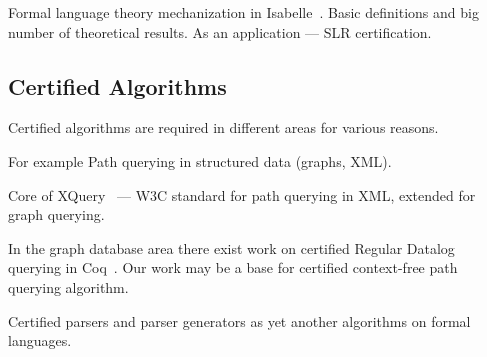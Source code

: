Formal language theory mechanization in Isabelle~\cite{1885-16399}.
Basic definitions and big number of theoretical results. 
As an application --- SLR certification.

\subsection{Certified Algorithms}

Certified algorithms are required in different areas for various reasons.

For example Path querying in structured data (graphs, XML).

Core of XQuery~\cite{10.1007/978-3-642-25379-9_21} --- W3C standard for path querying in XML, extended for graph querying.

In the graph database area there exist work on certified Regular Datalog querying in Coq~\cite{certifiedPrologGraphQuerying}. 
Our work may be a base for certified context-free path querying algorithm.

Certified parsers and parser generators as yet another algorithms on formal languages.